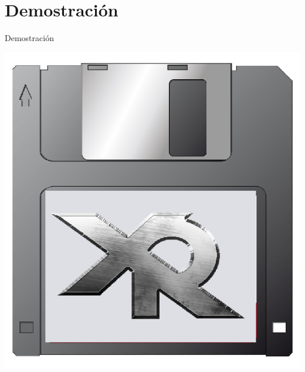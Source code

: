 \documentclass[10pt]{beamer}
\begin{document}
\section{Demostración}
\begin{frame}{Demostración}
\begin{block}
{\centering \includegraphics[scale=0.4]{AAUgraphics/demo.png}\par}
\end{block}
\end{frame}
\end{document}
